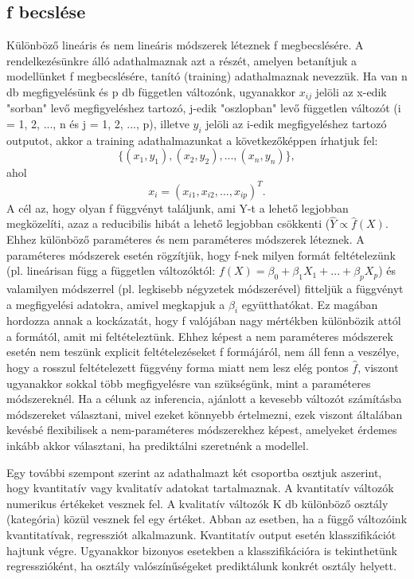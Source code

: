 \documentclass[12pt]{article}
\theoremstyle{plain}
\begin{document}
\subsection{f becslése}
Különböző lineáris és nem lineáris módszerek léteznek f megbecslésére. A rendelkezésünkre álló adathalmaznak azt a részét, amelyen betanítjuk a modellünket f megbecslésére, tanító (training) adathalmaznak nevezzük. Ha van n db megfigyelésünk és p db független változónk, ugyanakkor $x_{ij}$ jelöli az x-edik "sorban" levő megfigyeléshez tartozó, j-edik "oszlopban" levő független változót (i = 1, 2, ..., n és j = 1, 2, ..., p), illetve $y_i$ jelöli az i-edik megfigyeléshez tartozó outputot, akkor a training adathalmazunkat a következőképpen írhatjuk fel: $$ \{(x_1, y_1), (x_2, y_2), ..., (x_n, y_n)\}, $$ ahol $$ x_i = (x_{i1}, x_{i2}, ..., x_{ip})^T.$$ A cél az, hogy olyan f függvényt találjunk, ami Y-t a lehető legjobban megközelíti, azaz a reducibilis hibát a lehető legjobban csökkenti ($\hat{Y} \propto \hat{f}(X).$ Ehhez különböző paraméteres és nem paraméteres módszerek léteznek. A paraméteres módszerek esetén rögzítjük, hogy f-nek milyen formát feltételezünk (pl. lineárisan függ a független változóktól: $ f(X) = \beta_0 + \beta_1 X_1 + ... + \beta_p X_p $) és valamilyen módszerrel (pl. legkisebb négyzetek módszerével) fitteljük a függvényt a megfigyelési adatokra, amivel megkapjuk a $\beta_i$ együtthatókat. Ez magában hordozza annak a kockázatát, hogy f valójában nagy mértékben különbözik attól a formától, amit mi feltételeztünk. Ehhez képest a nem paraméteres módszerek esetén nem teszünk explicit feltételezéseket f formájáról, nem áll fenn a veszélye, hogy a rosszul feltételezett függvény forma miatt nem lesz elég pontos $\hat{f}$, viszont ugyanakkor sokkal több megfigyelésre van szükségünk, mint a paraméteres módszereknél. Ha a célunk az inferencia, ajánlott a kevesebb változót számításba módszereket választani, mivel ezeket könnyebb értelmezni, ezek viszont általában kevésbé flexibilisek a nem-paraméteres módszerekhez képest, amelyeket érdemes inkább akkor választani, ha prediktálni szeretnénk a modellel. 

Egy további szempont szerint az adathalmazt két csoportba osztjuk aszerint, hogy kvantitatív vagy kvalitatív adatokat tartalmaznak. A kvantitatív változók numerikus értékeket vesznek fel. A kvalitatív változók K db különböző osztály (kategória) közül vesznek fel egy értéket. Abban az esetben, ha a függő változóink kvantitatívak, regressziót alkalmazunk. Kvantitatív output esetén klasszifikációt hajtunk végre. Ugyanakkor bizonyos esetekben a klasszifikációra is tekinthetünk regresszióként, ha osztály valószínűségeket prediktálunk konkrét osztály helyett. 
\end{document}
